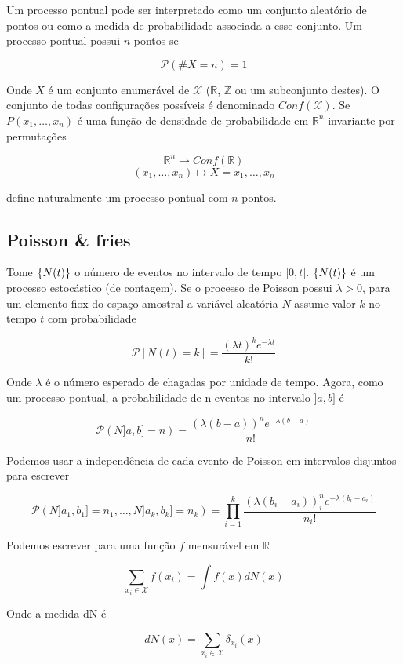 Um processo pontual pode ser interpretado como um conjunto aleatório de pontos ou como a medida de probabilidade associada a esse conjunto. Um processo pontual possui $n$ pontos se

\[
\mathcal{P}(\# X=n) = 1
\]

Onde $X$ é um conjunto enumerável de $\mathcal{X}$ ($\mathbb{R}$, $\mathbb{Z}$ ou um subconjunto destes). O conjunto de todas configurações possíveis é denominado $Conf(\mathcal{X})$. Se $P(x_1, \dots, x_n)$ é uma função de densidade de probabilidade em $\mathbb{R}^n$ invariante por permutações

\[
	\mathbb{R}^n \rightarrow Conf(\mathbb{R})
\]
\[
	(x_1, \dots, x_n) \mapsto X = {x_1, \dots, x_n}
\]

define naturalmente um processo pontual com $n$ pontos.

\subsection{Poisson \& fries}

Tome $\{N(t)\}$ o número de eventos no intervalo de tempo $]0,t]$. $\{N(t)\}$  é um processo estocástico (de contagem). Se o processo de Poisson possui $\lambda > 0$, para um elemento fiox do espaço amostral a variável aleatória $N$ assume valor $k$ no tempo $t$ com probabilidade

\begin{equation}
	\mathcal{P}[N(t) = k] = \frac{(\lambda t)^k e^{-\lambda t}}{k!}
\end{equation}

Onde $\lambda$ é o número esperado de chagadas por unidade de tempo. Agora, como um processo pontual, a probabilidade de n eventos no intervalo $]a,b]$ é

\[
	\mathcal{P}(N]a,b] = n) =  \frac{(\lambda (b-a))^n e^{-\lambda (b-a)}}{n!}
\]

Podemos usar a independência de cada evento de Poisson em intervalos disjuntos para escrever

\[
	\mathcal{P}(N]a_1,b_1] = n_1, \dots, N]a_k,b_k] = n_k) = \prod_{i=1}^{k} \frac{(\lambda (b_i-a_i))^n_i e^{-\lambda (b_i-a_i)}}{n_i!}
\]

Podemos escrever para uma função $f$ mensurável em $\mathbb{R}$

\[
	\sum_{x_i \in \mathcal{X}} f(x_i) = \int f(x) dN(x)
\]

Onde a medida dN é

\[
	dN(x) = \sum_{x_i \in \mathcal{X}} \delta_{x_i} (x)
\]

